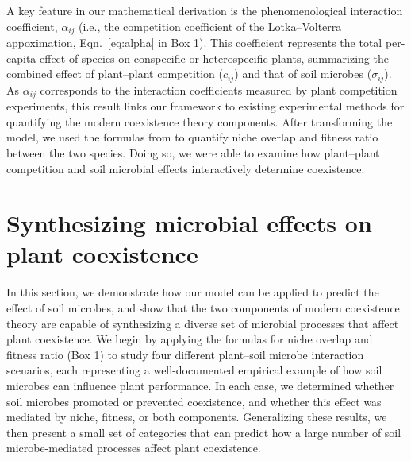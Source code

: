 A key feature in our mathematical derivation is the phenomenological interaction coefficient, $\alpha_{ij}$ (i.e., the competition coefficient of the Lotka--Volterra appoximation, Eqn.~\ref{eq:alpha} in Box 1). This coefficient represents the total per-capita effect of species on conspecific or heterospecific plants, summarizing the combined effect of plant--plant competition ($c_{ij}$) and that of soil microbes ($\sigma_{ij}$). As $\alpha_{ij}$ corresponds to the interaction coefficients measured by plant competition experiments, this result links our framework to existing experimental methods for quantifying the modern coexistence theory components.
After transforming the model, we used the formulas from \citep{Chesson2008} to quantify niche overlap and fitness ratio between the two species. Doing so, we were able to examine how plant--plant competition and soil microbial effects interactively determine coexistence.
\par



\section{Synthesizing microbial effects on plant coexistence}
In this section, we demonstrate how our model can be applied to predict the effect of soil microbes, and show that the two components of modern coexistence theory are capable of synthesizing a diverse set of microbial processes that affect plant coexistence. We begin by applying the formulas for niche overlap and fitness ratio (Box 1) to study four different plant--soil microbe interaction scenarios, each representing a well-documented empirical example of how soil microbes can influence plant performance. In each case, we determined whether soil microbes promoted or prevented coexistence, and whether this effect was mediated by niche, fitness, or both components. Generalizing these results, we then present a small set of categories that can predict how a large number of soil microbe-mediated processes affect plant coexistence.
\par



